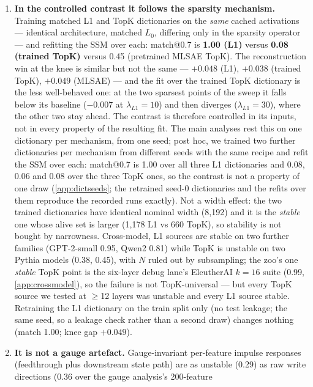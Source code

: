 \begin{enumerate}
  \item \textbf{In the controlled contrast it follows the sparsity
    mechanism.} Training matched L1 and
    TopK dictionaries on the \emph{same} cached activations --- identical
    architecture, matched $L_0$, differing only in the sparsity operator ---
    and refitting the SSM over each: match@0.7 is
    \textbf{1.00 (L1)} versus \textbf{0.08
    (trained TopK)} versus 0.45 (pretrained MLSAE TopK). The reconstruction
    win at the knee is similar but not the same --- $+0.048$ (L1), $+0.038$
    (trained TopK), $+0.049$ (MLSAE) --- and the fit over the trained TopK
    dictionary is the less well-behaved one: at the two sparsest points of
    the sweep it falls below its baseline ($-0.007$ at $\lambda_{L1}{=}10$)
    and then diverges ($\lambda_{L1}{=}30$), where the other two stay ahead.
    The contrast is therefore controlled in its inputs, not in every
    property of the resulting fit. The main analyses rest this on one
    dictionary per mechanism, from one seed; post hoc, we trained two further
    dictionaries per mechanism from different seeds with the same recipe and
    refit the SSM over each: match@0.7 is 1.00 over all three L1
    dictionaries and 0.08, 0.06 and 0.08 over the three TopK ones, so the
    contrast is not a property of one draw (\cref{app:dictseeds}; the
    retrained seed-0 dictionaries and the refits over them reproduce the
    recorded runs exactly). Not a width effect: the two
    trained dictionaries have identical nominal width (8{,}192) and it is the
    \emph{stable} one whose alive set is larger (1{,}178 L1 vs 660 TopK), so
    stability is not bought by narrowness. Cross-model, L1 sources are stable on two further
    families (GPT-2-small 0.95, Qwen2 0.81) while TopK is unstable on two
    Pythia models (0.38, 0.45), with $N$ ruled out by subsampling; the zoo's
    one \emph{stable} TopK point is the six-layer debug lane's EleutherAI
    $k{=}16$ suite (0.99, \cref{app:crossmodel}), so the failure is not
    TopK-universal --- but every TopK source we tested at $\ge$12 layers was
    unstable and every L1 source stable. Retraining
    the L1 dictionary on the train split only (no test leakage; the same
    seed, so a leakage check rather than a second draw) changes
    nothing (match 1.00; knee gap $+0.049$).
  \item \textbf{It is not a gauge artefact.} Gauge-invariant per-feature
    impulse responses (feedthrough plus downstream state path) are as unstable
    (0.29) as raw write directions (0.36 over the gauge analysis's 200-feature

\end{enumerate}
